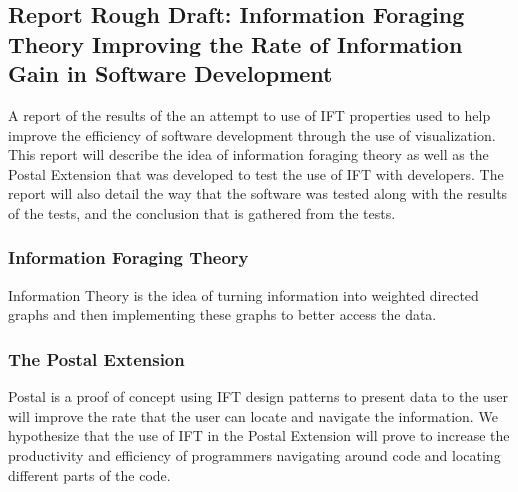 \documentclass[letterpaper,10pt,titlepage,draftclsnofoot,onecolumn,onesided] {IEEEtran}
\begin{document}
	\subsection{Report Rough Draft: Information Foraging Theory Improving the Rate of Information Gain in Software Development}
	A report of the results of the an attempt to use of IFT properties used to help improve the efficiency of software development through the use of visualization. This report will describe the idea of information foraging theory as well as the Postal Extension that was developed to test the use of IFT with developers. The report will also detail the way that the software was tested along with the results of the tests, and the conclusion that is gathered from the tests. 
	
	\subsubsection{Information Foraging Theory}
	Information Theory is the idea of turning information into weighted directed graphs and then implementing these graphs to better access the data.
	
	\subsubsection{The Postal Extension}
	Postal is a proof of concept using IFT design patterns to present data to the user will improve the rate that the user can locate and navigate the information.
	We hypothesize that the use of IFT in the Postal Extension will prove to increase the productivity and efficiency of programmers navigating around code and locating different parts of the code.  
	
\end{document}
